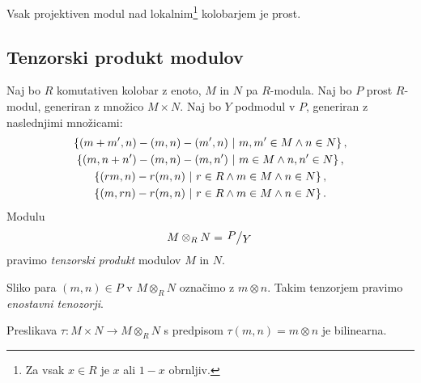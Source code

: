 \begin{opomba}
Vsak projektiven modul nad lokalnim\footnote{Za vsak $x \in R$ je
$x$ ali $1-x$ obrnljiv.} kolobarjem je prost.
\end{opomba}

\newpage

\subsection{Tenzorski produkt modulov}


\begin{definicija}
Naj bo $R$ komutativen kolobar z enoto, $M$ in $N$ pa $R$-modula.
Naj bo $P$ prost $R$-modul, generiran z množico $M \times N$. Naj
bo $Y$ podmodul v $P$, generiran z naslednjimi množicami:
\begin{gather*} 
\left\{(m + m', n) - (m, n) - (m', n)~\middle\vert~m, m' \in M \land n \in N\right\},
\\
\left\{(m, n + n') - (m, n) - (m, n')~\middle\vert~m \in M \land n, n' \in N\right\},
\\
\left\{(rm, n) - r (m, n)~\middle\vert~r \in R \land m \in M \land n \in N\right\},
\\
\left\{(m, rn) - r (m, n)~\middle\vert~r \in R \land m \in M \land n \in N\right\}.
\end{gather*}
Modulu
\[
M \otimes_R N = \kvoc{P}{Y}
\]
pravimo \emph{tenzorski produkt}
modulov $M$ in $N$.
\end{definicija}

\begin{opomba}
Sliko para $(m, n) \in P$ v $M \otimes_R N$ označimo z
$m \otimes n$. Takim tenzorjem pravimo \emph{enostavni tenozorji}.
\end{opomba}

\begin{opomba}
Preslikava $\tau \colon M \times N \to M \otimes_R N$ s predpisom
$\tau(m,n) = m \otimes n$ je bilinearna.
\end{opomba}

